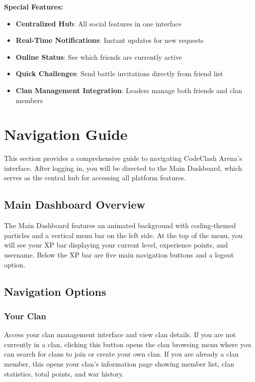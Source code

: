 \documentclass[12pt,a4paper]{article}
\begin{document}
\textbf{Special Features:}
\begin{itemize}[leftmargin=1.8em]
\item \textbf{Centralized Hub}: All social features in one interface
\item \textbf{Real-Time Notifications}: Instant updates for new requests
\item \textbf{Online Status}: See which friends are currently active
\item \textbf{Quick Challenges}: Send battle invitations directly from friend list
\item \textbf{Clan Management Integration}: Leaders manage both friends and clan members
\end{itemize}

\FloatBarrier


\section{Navigation Guide}

This section provides a comprehensive guide to navigating CodeClash Arena's interface. After logging in, you will be directed to the Main Dashboard, which serves as the central hub for accessing all platform features.

\subsection{Main Dashboard Overview}

The Main Dashboard features an animated background with coding-themed particles and a vertical menu bar on the left side. At the top of the menu, you will see your XP bar displaying your current level, experience points, and username. Below the XP bar are five main navigation buttons and a logout option.

\subsection{Navigation Options}

\subsubsection{Your Clan}

Access your clan management interface and view clan details. If you are not currently in a clan, clicking this button opens the clan browsing menu where you can search for clans to join or create your own clan. If you are already a clan member, this opens your clan's information page showing member list, clan statistics, total points, and war history.
\end{document}
